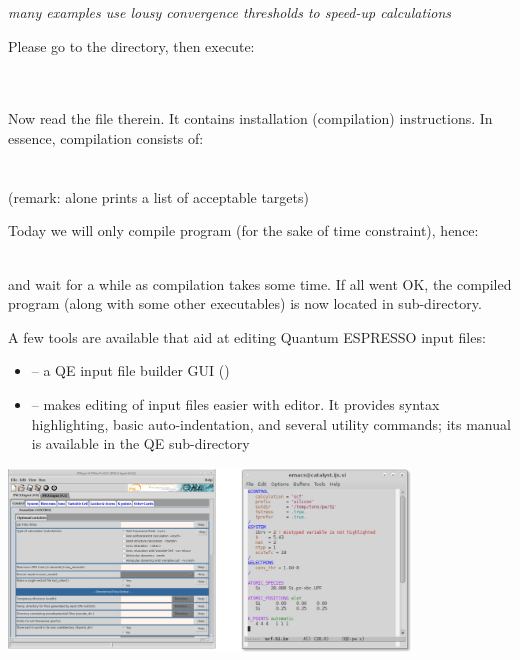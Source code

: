 \documentclass[landscape]{foils}
\begin{document}
{ {\em many examples use lousy convergence
    thresholds to speed-up calculations}}

%
Please go to the  directory, then execute:\\[1em]
\\
\\

Now read the  file therein. It contains installation
(compilation) instructions. In essence, compilation consists of:\\[1em]
\\
\\[0.5em]
(remark:  alone prints a list of acceptable targets)

Today we will only compile  program (for the sake of time constraint), hence:\\[0.5em]
\\

and wait for a while as compilation takes some time. If all went OK,
the compiled  program (along with some other executables)
is now located in  sub-directory.


\rightheader{}
\rightfooter{}
A few tools are available that aid at editing Quantum ESPRESSO input files:
\begin{itemize}
\item {} -- a QE input file builder GUI ()
\item {} -- makes editing of input files easier
  with  editor. It provides syntax highlighting, basic
  auto-indentation, and several utility commands; its manual is
  available in the QE sub-directory
\end{itemize}
\begin{center}
  \includegraphics[width=0.8\textwidth]{figs/pwgui+emacs-modes.png}
\end{center}
\end{document}

